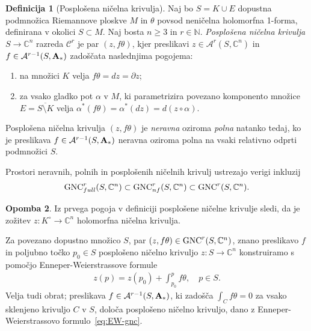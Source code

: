 \documentclass[12pt,a4paper,twoside]{article}
\theoremstyle{definition} %
\newtheorem{definicija}{Definicija}[section]
\newtheorem{opomba}[definicija]{Opomba}
\theoremstyle{plain} %
\numberwithin{equation}{section}  %
\newcommand{\N}{\mathbb N}
\newcommand{\C}{\mathbb C}
\begin{document}
\begin{definicija} [Posplošena ničelna krivulja]
Naj bo $S = K \cup E$ dopustna podmnožica Riemannove ploskve $M$ in $\theta$ povsod neničelna holomorfna 1-forma, definirana v okolici $S \subset M$.
Naj bosta $n \geq 3$ in $r \in \N$. \emph{Posplošena ničelna krivulja} $S \to \C^{n}$ razreda $\mathcal{C}^{r}$ je par $(z, f \theta)$, kjer preslikavi $z \in \mathcal{A}^{r}(S, \C^{n})$ in $f \in \mathcal{A}^{r-1}(S, \textbf{\textup{A}}_{*})$ zadoščata naslednjima pogojema:
\begin{enumerate}
\item na množici $K$ velja $f \theta = dz = \partial z$;
\item za vsako gladko pot $\alpha$ v $M$, ki parametrizira povezano komponento množice $E = \overline{S \setminus K}$ velja $ \alpha^{*}(f \theta) = \alpha^{*}(dz) = d(z \circ \alpha)$.
\end{enumerate}
%
Posplošena ničelna krivulja $(z, f \theta)$ je \emph{neravna} oziroma \emph{polna} natanko tedaj, ko je preslikava $f \in \mathcal{A}^{r-1}(S, \textbf{\textup{A}}_{*})$ neravna oziroma polna na vsaki relativno odprti podmnožici $S$.
\end{definicija}

Prostori neravnih, polnih in posplošenih ničelnih krivulj ustrezajo verigi inkluzij
\begin{gather*}
\textup{GNC}_{full}^{r}(S, \C^{n}) \subset \textup{GNC}_{nf}^{r}(S, \C^{n}) \subset \textup{GNC}^{r}(S, \C^{n}).
\end{gather*}

\begin{opomba}
Iz prvega pogoja v definiciji posplošene ničelne krivulje sledi, da je zožitev $z \colon K^{\circ} \to \mathbb{C}^{n}$ holomorfna ničelna krivulja.
\end{opomba}

Za povezano dopustno množico $S$, par $(z, f \theta) \in \textup{GNC}^{r}(S, \C^{n})$, znano preslikavo $f$ in poljubno točko $p_{0} \in S$ posplošeno ničelno krivuljo $z \colon S \to \C^{n}$ konstruiramo s pomočjo Enneper-Weierstrassove formule
\begin{align} \label{eq:EW-gnc}
z(p) = z(p_{0}) + \int_{p_0}^{p} f \theta, \quad p \in S.
\end{align} 
Velja tudi obrat; preslikava $f \in \mathcal{A}^{r-1}(S, \textbf{\textup{A}}_{*})$, ki zadošča $\int_{C} f \theta = 0$ za vsako sklenjeno krivuljo $C$ v $S$, določa posplošeno ničelno krivuljo, dano z Enneper-Weierstrassovo formulo~\eqref{eq:EW-gnc}.
\end{document}
